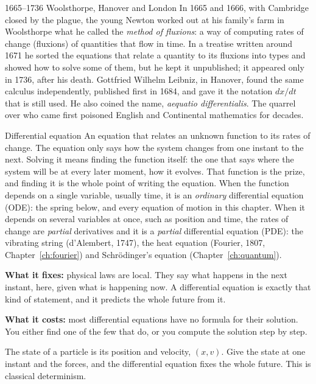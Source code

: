 \begin{history}{1665--1736 \textperiodcentered{} Woolsthorpe, Hanover and London}
In 1665 and 1666, with Cambridge closed by the plague, the young Newton worked out at
his family's farm in Woolsthorpe what he called the \emph{method of fluxions}: a way
of computing rates of change (fluxions) of quantities that flow in time. In a treatise
written around 1671 he sorted the equations that relate a quantity to its fluxions into
types and showed how to solve some of them, but he kept it unpublished; it appeared
only in 1736, after his death. Gottfried Wilhelm Leibniz, in Hanover, found the same
calculus independently, published first in 1684, and gave it the notation $dx/dt$ that
is still used. He also coined the name, \emph{aequatio differentialis}. The quarrel over
who came first poisoned English and Continental mathematics for decades.
\end{history}

\begin{concept}{Differential equation}
An equation that relates an unknown function to its rates of change. The equation
only says how the system changes from one instant to the next. Solving it means
finding the function itself: the one that says where the system will be at every later
moment, how it evolves. That function is the prize, and finding it is the whole point of
writing the equation. When the function depends on a single variable, usually time, it
is an \emph{ordinary} differential equation (ODE): the spring below, and every equation
of motion in this chapter. When it depends on several variables at once, such as
position and time, the rates of change are \emph{partial} derivatives and it is a
\emph{partial} differential equation (PDE): the vibrating string (d'Alembert, 1747), the
heat equation (Fourier, 1807, Chapter~\ref{ch:fourier}) and Schrödinger's equation
(Chapter~\ref{ch:quantum}).

\textbf{What it fixes:} physical laws are local. They say what happens in the next
instant, here, given what is happening now. A differential equation is exactly that
kind of statement, and it predicts the whole future from it.

\textbf{What it costs:} most differential equations have no formula for their
solution. You either find one of the few that do, or you compute the solution step by
step.
\end{concept}

The state of a particle is its position and velocity, $(x, v)$. Give the state at one
instant and the forces, and the differential equation fixes the whole future. This is
classical determinism.

